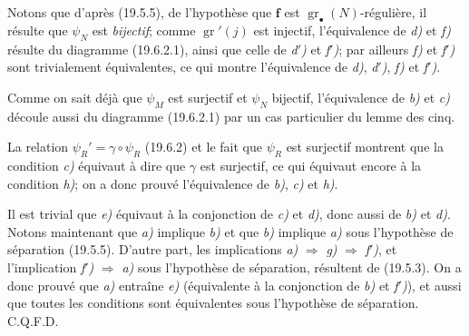 Notons que d'après (19.5.5), de l'hypothèse que $\mathbf f$ est $\operatorname{gr}_\bullet(N)$-régulière, il résulte que $\psi_N$ est \emph{bijectif}; comme $\operatorname{gr}'(j)$ est injectif, l'équivalence de \emph{d)} et \emph{f)} résulte du diagramme (19.6.2.1), ainsi que celle de \emph{d$'$)} et \emph{f$'$)}; par ailleurs \emph{f)} et \emph{f$'$)} sont trivialement équivalentes, ce qui montre l'équivalence de \emph{d)}, \emph{d$'$)}, \emph{f)} et \emph{f$'$)}.

Comme on sait déjà que $\psi_M$ est surjectif et $\psi_N$ bijectif, l'équivalence de \emph{b)} et \emph{c)} découle aussi du diagramme (19.6.2.1) par un cas particulier du lemme des cinq.

La relation $\psi_R'=\gamma\circ\psi_R$ (19.6.2) et le fait que $\psi_R$ est surjectif montrent que la condition \emph{c)} équivaut à dire que $\gamma$ est surjectif, ce qui équivaut encore à la condition \emph{h)}; on a donc prouvé l'équivalence de \emph{b)}, \emph{c)} et \emph{h)}.

Il est trivial que \emph{e)} équivaut à la conjonction de \emph{c)} et \emph{d)}, donc aussi de \emph{b)} et \emph{d)}. Notons maintenant que \emph{a)} implique \emph{b)} et que \emph{b)} implique \emph{a)} sous l'hypothèse de séparation (19.5.5). D'autre part, les implications \emph{a)} $\Rightarrow$ \emph{g)} $\Rightarrow$ \emph{f$'$)}, et l'implication \emph{f$'$)} $\Rightarrow$ \emph{a)} sous l'hypothèse de séparation, résultent de (19.5.3). On a donc prouvé que \emph{a)} entraîne \emph{e)} (équivalente à la conjonction de \emph{b)} et \emph{f$'$)}), et aussi que toutes les conditions sont équivalentes sous l'hypothèse de séparation. C.Q.F.D.

